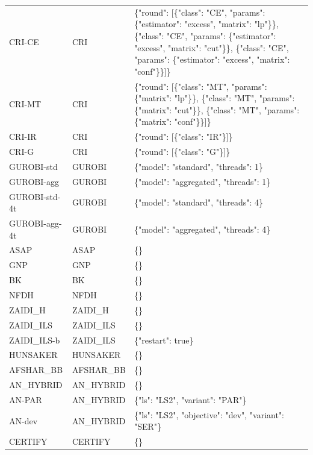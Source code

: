 \begin{table}[htbp]
\begin{tabular}{lll}
CRI-CE & CRI & \{"round": [\{"class": "CE", "params": \{"estimator": "excess", "matrix": "lp"\}\}, \{"class": "CE", "params": \{"estimator": "excess", "matrix": "cut"\}\}, \{"class": "CE", "params": \{"estimator": "excess", "matrix": "conf"\}\}]\} \\
CRI-MT & CRI & \{"round": [\{"class": "MT", "params": \{"matrix": "lp"\}\}, \{"class": "MT", "params": \{"matrix": "cut"\}\}, \{"class": "MT", "params": \{"matrix": "conf"\}\}]\} \\
CRI-IR & CRI & \{"round": [\{"class": "IR"\}]\} \\
CRI-G & CRI & \{"round": [\{"class": "G"\}]\} \\
GUROBI-std & GUROBI & \{"model": "standard", "threads": 1\} \\
GUROBI-agg & GUROBI & \{"model": "aggregated", "threads": 1\} \\
GUROBI-std-4t & GUROBI & \{"model": "standard", "threads": 4\} \\
GUROBI-agg-4t & GUROBI & \{"model": "aggregated", "threads": 4\} \\
ASAP & ASAP & \{\} \\
GNP & GNP & \{\} \\
BK & BK & \{\} \\
NFDH & NFDH & \{\} \\
ZAIDI\_H & ZAIDI\_H & \{\} \\
ZAIDI\_ILS & ZAIDI\_ILS & \{\} \\
ZAIDI\_ILS-b & ZAIDI\_ILS & \{"restart": true\} \\
HUNSAKER & HUNSAKER & \{\} \\
AFSHAR\_BB & AFSHAR\_BB & \{\} \\
AN\_HYBRID & AN\_HYBRID & \{\} \\
AN-PAR & AN\_HYBRID & \{"ls": "LS2", "variant": "PAR"\} \\
AN-dev & AN\_HYBRID & \{"ls": "LS2", "objective": "dev", "variant": "SER"\} \\
CERTIFY & CERTIFY & \{\} \\
\bottomrule
\end{tabular}
\end{table}
